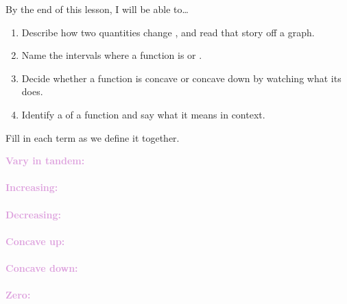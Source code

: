 \documentclass[10pt]{article}
\begin{document}

\vspace{0.12in}

\begin{objectivebox}
By the end of this lesson, I will be able to\ldots
\begin{enumerate}[itemsep=2pt]
  \item Describe how two quantities change \blank{2.4cm}, and read that
        story off a graph.
  \item Name the intervals where a function is \blank{2.6cm} or
        \blank{2.6cm}.
  \item Decide whether a function is concave \blank{1.4cm} or concave down by
        watching what its \blank{3.2cm} does.
  \item Identify a \blank{1.6cm} of a function and say what it means in context.
\end{enumerate}
\end{objectivebox}

\vspace{0.1in}

\boxguard
\begin{vocabbox}
Fill in each term as we define it together.
\par\vspace{2pt}
\noindent\textbf{\textcolor{plum}{Vary in tandem:}}\\[1pt]
\writeline\\[3pt]
\noindent\textbf{\textcolor{plum}{Increasing:}}\\[1pt]
\writeline\\[3pt]
\noindent\textbf{\textcolor{plum}{Decreasing:}}\\[1pt]
\writeline\\[3pt]
\noindent\textbf{\textcolor{plum}{Concave up:}}\\[1pt]
\writeline\\[3pt]
\noindent\textbf{\textcolor{plum}{Concave down:}}\\[1pt]
\writeline\\[3pt]
\noindent\textbf{\textcolor{plum}{Zero:}}\\[1pt]
\writeline
\end{vocabbox}

\vspace{0.1in}
\end{document}
